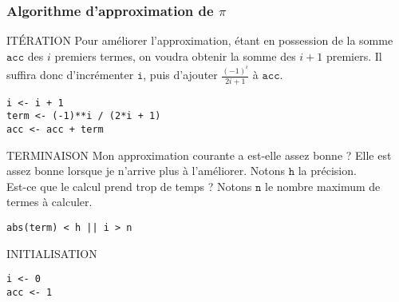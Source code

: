 \documentclass[10pt]{beamer}
\begin{document}
\begin{frame}[fragile]
  \frametitle{Algorithme d'approximation de $\pi$}
  \begin{block}{ITÉRATION}
    Pour \alert{améliorer} l'approximation, étant en possession de la somme $\mathtt{acc}$ des $i$ premiers termes, on voudra obtenir la somme des $i+1$ premiers. Il suffira donc d'incrémenter $\mathtt{i}$, \alert{puis} d'ajouter $ \frac{(-1)^{i}}{2i+ 1}$ à $\mathtt{acc}$.
    \begin{lstlisting}[style=editor]
i <- i + 1
term <- (-1)**i / (2*i + 1)
acc <- acc + term

    \end{lstlisting}
  \end{block}

  \begin{block}{TERMINAISON}
    Mon approximation courante a est-elle \alert{assez bonne} ? Elle est assez bonne lorsque je n'arrive plus à l'améliorer. Notons $\mathtt{h}$ la précision. \\
     Est-ce que le calcul \alert{prend trop de temps} ? Notons $\mathtt{n}$ le nombre maximum de termes à calculer.
\begin{lstlisting}[style=editor]
 abs(term) < h || i > n
\end{lstlisting}
\end{block}
\begin{block}{INITIALISATION}
  \begin{lstlisting}[style=edblock]
i <- 0
acc <- 1
\end{lstlisting}
\end{block}
\end{frame}
\end{document}
